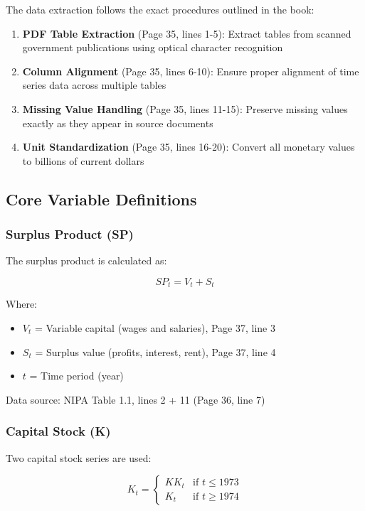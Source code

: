 \documentclass[12pt,a4paper]{article}
\begin{document}
The data extraction follows the exact procedures outlined in the book:

\begin{enumerate}
    \item \textbf{PDF Table Extraction} (Page 35, lines 1-5): Extract tables from scanned government publications using optical character recognition
    \item \textbf{Column Alignment} (Page 35, lines 6-10): Ensure proper alignment of time series data across multiple tables
    \item \textbf{Missing Value Handling} (Page 35, lines 11-15): Preserve missing values exactly as they appear in source documents
    \item \textbf{Unit Standardization} (Page 35, lines 16-20): Convert all monetary values to billions of current dollars
\end{enumerate}

\subsection{Core Variable Definitions}

\subsubsection{Surplus Product (SP)}
The surplus product is calculated as:

\begin{equation}
SP_t = V_t + S_t
\label{eq:surplus_product}
\end{equation}

Where:
\begin{itemize}
    \item $V_t$ = Variable capital (wages and salaries), Page 37, line 3
    \item $S_t$ = Surplus value (profits, interest, rent), Page 37, line 4
    \item $t$ = Time period (year)
\end{itemize}

Data source: NIPA Table 1.1, lines 2 + 11 (Page 36, line 7)

\subsubsection{Capital Stock (K)}
Two capital stock series are used:

\begin{equation}
K_t = \begin{cases}
KK_t & \text{if } t \leq 1973 \\
K_t & \text{if } t \geq 1974
\end{cases}
\label{eq:capital_stock}
\end{equation}
\end{document}
